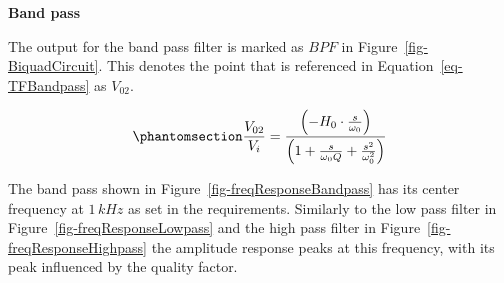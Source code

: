 \documentclass[
  letterpaper,
]{scrbook}
\begin{document}
\textbf{Band pass}

The output for the band pass filter is marked as \(BPF\) in
Figure~\ref{fig-BiquadCircuit}. This denotes the point that is
referenced in Equation~\ref{eq-TFBandpass} as \(V_{02}\).

\begin{equation}\phantomsection\label{eq-TFBandpass}{
\frac{V_{02}}{V_i} = \frac{\left( - H_0 \cdot \frac{s}{\omega_0} \right)}{\left( 1 + \frac{s}{\omega_0 Q} + \frac{s^2}{\omega_0^2} \right)}
}\end{equation}

The band pass shown in Figure~\ref{fig-freqResponseBandpass} has its
center frequency at \(1\,kHz\) as set in the requirements. Similarly to
the low pass filter in Figure~\ref{fig-freqResponseLowpass} and the high
pass filter in Figure~\ref{fig-freqResponseHighpass} the amplitude
response peaks at this frequency, with its peak influenced by the
quality factor.
\end{document}
